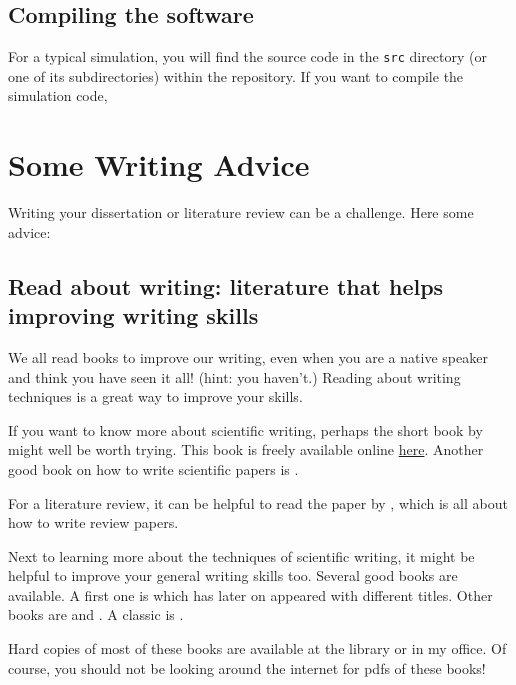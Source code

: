 \documentclass[
]{book}
\begin{document}
\hypertarget{compiling-the-software}{%
\section{Compiling the software}\label{compiling-the-software}}

For a typical simulation, you will find the source code in the \texttt{src} directory (or one of its subdirectories) within the repository. If you want to compile the simulation code,

\hypertarget{some-writing-advice}{%
\chapter{Some Writing Advice}\label{some-writing-advice}}

Writing your dissertation or literature review can be a challenge. Here some advice:

\hypertarget{read-about-writing-literature-that-helps-improving-writing-skills}{%
\section{Read about writing: literature that helps improving writing skills}\label{read-about-writing-literature-that-helps-improving-writing-skills}}

We all read books to improve our writing, even when you are a native speaker and think you have seen it all! (hint: you haven't.) Reading about writing techniques is a great way to improve your skills.

If you want to know more about scientific writing, perhaps the short book by \citet{Mack2018} might well be worth trying. This book is freely available online \href{https://spie.org/Publications/Book/2317706?SSO=1}{here}. Another good book on how to write scientific papers is \citet{Gastel2022}.

For a literature review, it can be helpful to read the paper by \citet{Sayer2018}, which is all about how to write review papers.

Next to learning more about the techniques of scientific writing, it might be helpful to improve your general writing skills too. Several good books are available. A first one is \citet{Williams1990} which has later on appeared
with different titles. Other books are \citet{Pinker2014} and \citet{Zinsser2006}. A classic is \citet{Strunk1959}.

Hard copies of most of these books are available at the library or in my office. Of course, you should not be looking around the internet for pdfs of these books!
\end{document}
